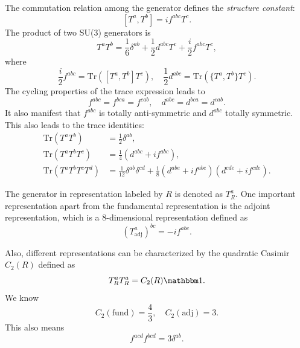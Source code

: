 The commutation relation among the generator defines the \textit{structure constant}:
\begin{equation}
	\left[T^a, T^b\right] = i f^{abc} T^c.
\end{equation}
The product of two SU(3) generators is
\begin{equation}
	T^a T^b = \frac{1}{6}\delta^{ab} + \frac{1}{2} d^{abc} T^c + \frac{i}{2} f^{abc} T^c,
\end{equation}
where
\begin{equation}
	\frac{i}{2} f^{abc} = \mathrm{Tr}\left([T^a,T^b]T^c \right), \quad
	\frac{1}{2} d^{abc} = \mathrm{Tr}\left(\{T^a,T^b\}T^c \right).
\end{equation}
The cycling properties of the trace expression leads to 
\begin{equation}
	f^{abc} = f^{bca} = f^{cab}, \quad
	d^{abc} = d^{bca} = d^{cab}.
\end{equation}
It also manifest that $f^{abc}$ is totally anti-symmetric and $d^{abc}$ totally symmetric.
This also leads to the trace identities:
\begin{equation}
\begin{aligned}
	\mathrm{Tr}(T^a T^b) &= \frac{1}{2}\delta^{ab}, \\
	\mathrm{Tr}(T^a T^b T^c) &= \frac{1}{4}(d^{abc} + if^{abc}), \\
	\mathrm{Tr}(T^a T^b T^c T^d) &= \frac{1}{12} \delta^{ab}\delta^{cd} + \frac{1}{8}(d^{abe}+if^{abe})(d^{cde}+if^{cde}).
\end{aligned}
\end{equation}

The generator in representation labeled by $R$ is denoted as $T_R^a$.
One important representation apart from the fundamental representation is the adjoint representation, which is a 8-dimensional representation defined as
\begin{equation}
	(T^a_{\mathrm{adj}})^{bc} = -i f^{abc}.
\end{equation}

Also, different representations can be characterized by the quadratic Casimir $C_2(R)$ defined as
\begin{equation}
	T^a_R T^a_R = C_2(R) \mathbbm 1.
\end{equation}
We know
\begin{equation}
	C_2(\text{fund}) = \frac{4}{3},\quad
	C_2(\text{adj}) =3.
\end{equation}
This also means
\begin{equation}
	f^{acd} f^{bcd} = 3 \delta^{ab}.
\end{equation}





